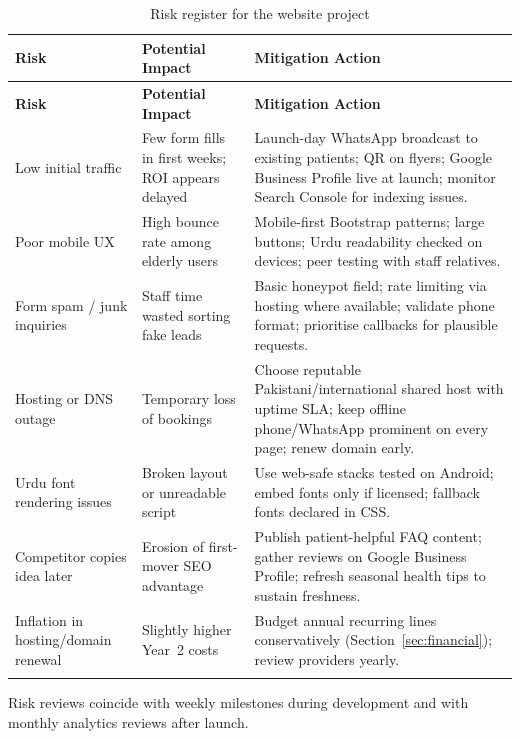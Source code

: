 \documentclass[12pt, a4paper]{article}
\begin{document}
\begin{longtable}{@{} L{3.6cm} L{5cm} L{5.8cm} @{}}
\toprule
\textbf{Risk} & \textbf{Potential Impact} & \textbf{Mitigation Action} \\
\midrule
\endfirsthead
\toprule
\textbf{Risk} & \textbf{Potential Impact} & \textbf{Mitigation Action} \\
\midrule
\endhead
Low initial traffic &
Few form fills in first weeks; ROI appears delayed &
Launch-day WhatsApp broadcast to existing patients; QR on flyers; Google Business Profile live at launch; monitor Search Console for indexing issues. \\[6pt]
Poor mobile UX &
High bounce rate among elderly users &
Mobile-first Bootstrap patterns; large buttons; Urdu readability checked on devices; peer testing with staff relatives. \\[6pt]
Form spam / junk inquiries &
Staff time wasted sorting fake leads &
Basic honeypot field; rate limiting via hosting where available; validate phone format; prioritise callbacks for plausible requests. \\[6pt]
Hosting or DNS outage &
Temporary loss of bookings &
Choose reputable Pakistani/international shared host with uptime SLA; keep offline phone/WhatsApp prominent on every page; renew domain early. \\[6pt]
Urdu font rendering issues &
Broken layout or unreadable script &
Use web-safe stacks tested on Android; embed fonts only if licensed; fallback fonts declared in CSS. \\[6pt]
Competitor copies idea later &
Erosion of first-mover SEO advantage &
Publish patient-helpful FAQ content; gather reviews on Google Business Profile; refresh seasonal health tips to sustain freshness. \\[6pt]
Inflation in hosting/domain renewal &
Slightly higher Year~2 costs &
Budget annual recurring lines conservatively (Section~\ref{sec:financial}); review providers yearly. \\
\bottomrule
\caption{Risk register for the website project}
\label{tab:risks}
\end{longtable}

\noindent Risk reviews coincide with weekly milestones during development and with monthly analytics reviews after launch.

\newpage

\end{document}
